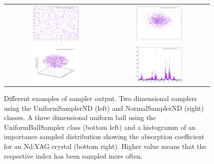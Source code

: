 \documentclass[a4paper,10pt]{article}
\begin{document}
    \begin{figure}
        \begin{tabular}{c c}
            \includegraphics[width=0.5\textwidth]{images/sampling_uniform.pdf} &
            \includegraphics[width=0.5\textwidth]{images/sampling_normal.pdf} \\
            \includegraphics[width=0.5\textwidth]{images/sampling_uniform_ball.pdf} &
            \includegraphics[width=0.5\textwidth]{images/sampling_importance.pdf}
        \end{tabular}
        \caption[Different examples of sampler output]{
        Different examples of sampler output.
        Two dimensional samplers using the UniformSamplerND (left) and 
        NormalSamplerND (right) classes.
        A three dimensional uniform ball using the UniformBallSampler class
        (bottom left) and a histogramm of an importance sampled distribution
        showing the absorption coefficient for an Nd:YAG crystal (bottom right).
        Higher value means that the respective index has been sampled more often.
        }
        \label{fig:sampler_example}
    \end{figure}
      
\end{document}
